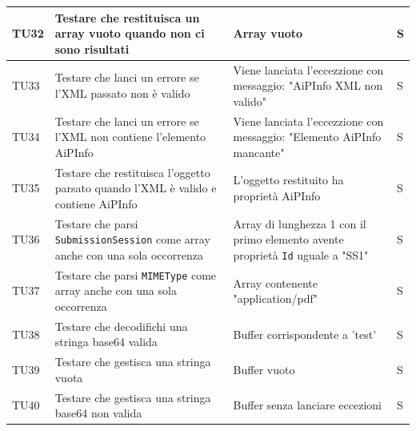 \documentclass[a4paper,12pt]{article}
\begin{document}
\begin{longtable}{|M{1.2cm}|M{5cm}|M{8cm}|M{1.5cm}|}
            TU32 & Testare che \texttt{} restituisca un array vuoto quando non ci sono risultati & Array vuoto & S \\
            \hline


            TU33 & Testare che \texttt{} lanci un errore se l'XML passato non è valido & Viene lanciata l'eccezzione con messaggio: "AiPInfo XML non valido" & S \\
            \hline

            TU34 & Testare che \texttt{} lanci un errore se l'XML non contiene l'elemento AiPInfo & Viene lanciata l'eccezzione con messaggio: "Elemento AiPInfo mancante" & S \\
            \hline

            TU35 & Testare che \texttt{} restituisca l'oggetto parsato quando l'XML è valido e contiene AiPInfo & L'oggetto restituito ha proprietà AiPInfo & S \\
            \hline

            TU36 & Testare che \texttt{} parsi \texttt{SubmissionSession} come array anche con una sola occorrenza & Array di lunghezza 1 con il primo elemento avente proprietà \texttt{Id} uguale a "SS1" & S \\
            \hline

            TU37 & Testare che \texttt{} parsi \texttt{MIMEType} come array anche con una sola occorrenza & Array contenente "application/pdf" & S \\
            \hline

            TU38 & Testare che \texttt{} decodifichi una stringa base64 valida & Buffer corrispondente a 'test' & S \\
            \hline

            TU39 & Testare che \texttt{} gestisca una stringa vuota & Buffer vuoto & S \\
            \hline

            TU40 & Testare che \texttt{} gestisca una stringa base64 non valida & Buffer senza lanciare eccezioni & S \\
            \hline


\end{longtable}
\end{document}
